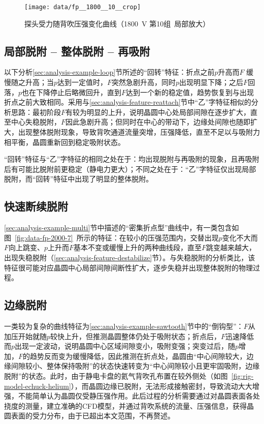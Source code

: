 \begin{figure}[thbp]
\centering
\texttt{[image: data/fp\_\_1800\_\_10\_\_crop]}
\caption{探头受力随背吹压强变化曲线（\SI{1800}{\V} 第10组\ 局部放大）}
\label{fig:data-fp-1800-10-crop}
\end{figure}


\subsection{局部脱附 -- 整体脱附 -- 再吸附}\label{sec:analysis-feature-loop}

以下分析\ref{sec:analysis-example-loop}节所述的“回转”特征：折点之前$p$升高而$F$ 缓慢随之升高；当$p$达到一定值时，$F$突然急剧升高，同时$p$出现明显下降；之后$F$回落，$p$也在下降停止后略微回升，直到$F$达到一个新的稳定值，趋势恢复到与出现折点之前大致相同。采用与\ref{sec:analysis-feature-reattach}节中“乙”字特征相似的分析思路：最初阶段$F$有较为明显的上升，说明晶圆中心处局部间隙在逐步扩大，直至中心失稳脱附，$F$因此急剧升高；但同时在中心的带动下，边缘处间隙也随即扩大，出现整体脱附现象，导致背吹通道流量突增，压强降低，直至不足以与吸附力相平衡，晶圆重新回到稳定吸附状态。

“回转”特征与“乙”字特征的相同之处在于：均出现脱附与再吸附的现象，且再吸附后有可能比脱附前更稳定（静电力更大）；不同之处在于：“乙”字特征仅出现局部脱附，而“回转”特征中出现了明显的整体脱附。


\subsection{快速断续脱附}\label{sec:analysis-feature-multi}

\ref{sec:analysis-example-multi}节中描述的“密集折点型”曲线中，有一类包含如图~\ref{fig:data-fp-2000-7}~所示的特征：在较小的压强范围内，交替出现$p$变化不大而$F$向上跳变、$p$上升而$F$基本不变或缓慢上升的两种曲线段，直至$F$跳变越来越大，出现失稳脱附（\ref{sec:analysis-feature-destabilize}节）。与失稳脱附的分析类比，该特征很可能对应晶圆中心局部间隙间断性扩大，逐步失稳并出现整体脱附的物理过程。


\subsection{边缘脱附}\label{sec:analysis-feature-rim}

一类较为复杂的曲线特征为\ref{sec:analysis-example-sawtooth}节中的“倒钩型”：$F$从加压开始就随$p$较快上升，但推测晶圆整体仍处于吸附状态；折点后，$F$迅速降低而$p$出现一定波动，说明晶圆中心区域间隙变小，吸附变强；突变过后，随$p$增加，$F$的趋势反而变为缓慢降低，因此推测在折点处，晶圆由“中心间隙较大，边缘间隙较小、整体保持吸附”的状态快速转变为“中心间隙较小且更牢固吸附，边缘脱附”的状态。此时，由于静电卡盘的氦气背吹孔布置在较外侧处（如图~\ref{fig:rig-model-echuck-helium}），而晶圆边缘已脱附，无法形成接触密封，导致流动大大增强，不能简单认为晶圆仅受静压强作用。此后过程的分析需要通过对晶圆表面各处挠度的测量，建立准确的CFD模型，并通过背吹系统的流量、压强信息，获得晶圆表面的受力分布，由于已超出本文范围，不再赘述。

